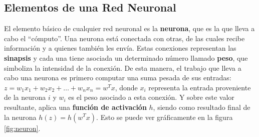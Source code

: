 \documentclass[aps,twocolumn,groupedaddress]{revtex4-2}
\begin{document}

\subsection{Elementos de una Red Neuronal}
El elemento básico de cualquier red neuronal es la \textbf{neurona}, que es la que lleva a cabo el ``cómputo''. Una neurona está conectada con otras, de las cuales recibe información y a quienes también les envía. Estas conexiones representan las \textbf{sinapsis} y cada una tiene asociada un determinado número llamado \textbf{peso}, que simboliza la intensidad de la conexión. De esta manera, el trabajo que lleva a cabo una neurona es primero computar una suma pesada de sus entradas: \( z = w_1x_1 + w_2x_2 + … + w_nx_n = w^T x\), donde \(x_i\) representa la entrada proveniente de la neurona \(i\) y \(w_i\) es el peso asociado a esta conexión. Y sobre este valor resultante, aplica una \textbf{función de activación} \(h\), siendo como resultado final de la neurona \(h(z) = h(w^T x)\). Esto se puede ver gráficamente en la figura \ref{fig:neuron}.
\end{document}
